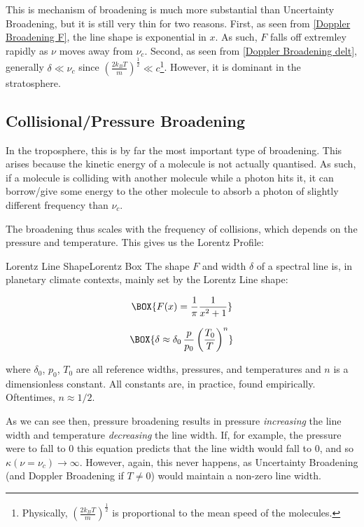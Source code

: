 This is mechanism of broadening is much more substantial than Uncertainty Broadening, but it is still very thin for two reasons. First, as seen from \ref{Doppler Broadening F}, the line shape is exponential in $x$. As such, $F$ falls off extremley rapidly as $\nu$ moves away from $\nu_c$. Second, as seen from \ref{Doppler Broadening delt}, generally $\delta\ll\nu_c$ since $\left( \frac{2k_BT}{m} \right)^{\frac{1}{2}}\ll c$\footnote{Physically, $\left( \frac{2k_BT}{m} \right)^{\frac{1}{2}}$ is proportional to the mean speed of the molecules.}. However, it is dominant in the stratosphere.

\subsection{Collisional/Pressure Broadening}

In the troposphere, this is by far the most important type of broadening. This arises because the kinetic energy of a molecule is not actually quantised. As such, if a molecule is colliding with another molecule while a photon hits it, it can borrow/give some energy to the other molecule to absorb a photon of slightly different frequency than $\nu_c$.

The broadening thus scales with the frequency of collisions, which depends on the pressure and temperature. This gives us the Lorentz Profile:
\begin{fact}{Lorentz Line Shape}{Lorentz Box}\label{Lorentz Box}
    The shape $F$ and width $\delta$ of a spectral line is, in planetary climate contexts, mainly set by the Lorentz Line shape: 
    \begin{multicols}{2}
    \begin{align}
        \label{Lorenz F}
        \BOX{F(x)=\frac{1}{\pi}\frac{1}{x^2+1}}
    \end{align}

    \vspace{18 mm}
    \begin{align}
        \label{Lorenz width}
        \BOX{
            \delta \approx \delta_0\,\frac{p}{p_0}\left( \frac{T_0}{T} \right)^{n}
        }
    \end{align}
    \end{multicols}
    where $\delta_0$, $p_0$, $T_0$ are all reference widths, pressures, and temperatures and $n$ is a dimensionless constant. All constants are, in practice, found empirically. Oftentimes, $n\approx 1/2$.
\end{fact}
As we can see then, pressure broadening results in pressure \textit{increasing} the line width and temperature \textit{decreasing} the line width. If, for example, the pressure were to fall to $0$ this equation predicts that the line width would fall to $0$, and so $\kappa(\nu=\nu_c)\to\infty$. However, again, this never happens, as Uncertainty Broadening (and Doppler Broadening if $T\neq 0$) would maintain a non-zero line width.


